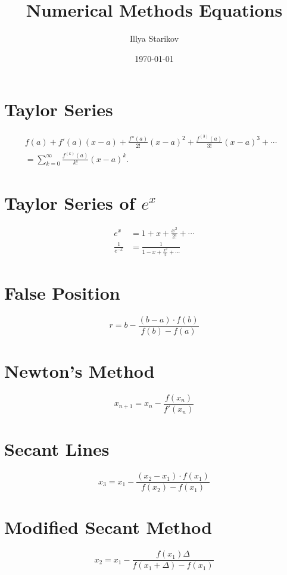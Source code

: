 \documentclass[11pt]{article}
\title{Numerical Methods Equations}
\date{\today}
\author{Illya Starikov}
\begin{document}
\maketitle

\section{Taylor Series}
\begin{align}
    f(a) + f'(a)(x - a) + \frac{f''(a)}{2!}(x - a)^2 + \frac{f^{(3)}(a)}{3!}(x - a)^3 + \cdots & \\ = \sum ^{\infty} _{k = 0} \frac{f^{(k)}(a)}{k!}(x - a)^k.
\end{align}

\section{Taylor Series of $e^x$}
\begin{align}
    e^x &= 1 + x + \frac{x^2}{2!} + \cdots \\
    \frac{1}{e^{-x}} &= \frac{1}{1 - x + \frac{x^2}{2} +\cdots }
\end{align}


\section{False Position}
\begin{equation}
    r = b - \frac{(b - a) \cdot f(b)}{f(b) - f(a)}
\end{equation}

\section{Newton's Method}
\begin{equation}
    x_{n + 1} = x_n - \frac{f(x_n)}{f'(x_n)}
\end{equation}


\section{Secant Lines}
\begin{equation}
    x_3 = x_1 - \frac{(x_2 - x_1) \cdot f(x_1)}{f(x_2) - f(x_1)}
\end{equation}

\section{Modified Secant Method}
\begin{equation}
    x_2 = x_1 - \frac{f(x_1) \Delta}{f(x_1+\Delta) - f(x_1)}
\end{equation}
\end{document}
